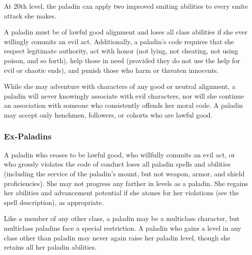  At 20th level, the paladin can apply two improved smiting abilities to every smite attack she makes.

 A paladin must be of lawful good alignment
and loses all class abilities if she ever willingly commits an evil act.
Additionally, a paladin's code requires that she respect legitimate
authority, act with honor (not lying, not cheating, not using poison,
and so forth), help those in need (provided they do not use the help
for evil or chaotic ends), and punish those who harm or threaten
innocents.

 While she may adventure with characters of any good or neutral alignment, a paladin will never knowingly associate with evil characters, nor will she continue an association with someone who consistently offends her moral code. A paladin may accept only henchmen, followers, or cohorts who are lawful good.

\subsubsection{Ex-Paladins}
A paladin who ceases to be lawful good, who willfully commits an evil act, or who grossly violates the code of conduct loses all paladin spells and abilities (including the service of the paladin's mount, but not weapon, armor, and shield proficiencies). She may not progress any farther in levels as a paladin. She regains her abilities and advancement potential if she atones for her violations (see the  spell description), as appropriate.

Like a member of any other class, a paladin may be a multiclass character, but multiclass paladins face a special restriction. A paladin who gains a level in any class other than paladin may never again raise her paladin level, though she retains all her paladin abilities.


